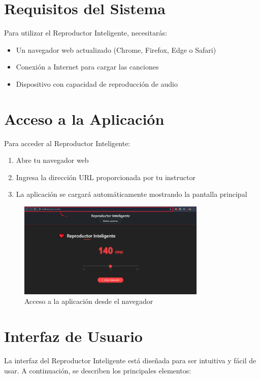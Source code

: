 \documentclass[a4paper,12pt]{article}
\begin{document}
\section{Requisitos del Sistema}
Para utilizar el Reproductor Inteligente, necesitarás:
\begin{itemize}
    \item Un navegador web actualizado (Chrome, Firefox, Edge o Safari)
    \item Conexión a Internet para cargar las canciones
    \item Dispositivo con capacidad de reproducción de audio
\end{itemize}

\section{Acceso a la Aplicación}
Para acceder al Reproductor Inteligente:
\begin{enumerate}
    \item Abre tu navegador web
    \item Ingresa la dirección URL proporcionada por tu instructor
    \item La aplicación se cargará automáticamente mostrando la pantalla principal
\end{enumerate}

 \begin{figure}[h]
     \centering
     \includegraphics[width=0.8\textwidth]{imagenes/acceso_navegador.png}
     \caption{Acceso a la aplicación desde el navegador}
 \end{figure}

\section{Interfaz de Usuario}
La interfaz del Reproductor Inteligente está diseñada para ser intuitiva y fácil de usar. A continuación, se describen los principales elementos:
\end{document}
